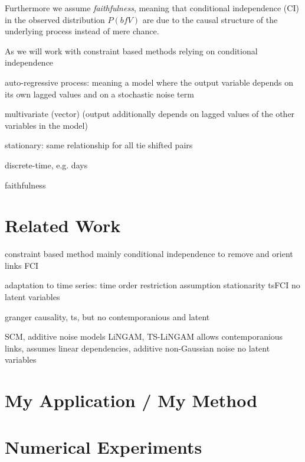 \documentclass[conference]{IEEEtran}
\begin{document}
Furthermore we assume \textit{faithfulness}, meaning that conditional independence (CI) in the observed distribution $P(bf{V})$ are due to the causal structure of the underlying process instead of mere chance.


As we will work with constraint based methods relying on conditional independence 


auto-regressive process:
meaning a model where the output variable depends on its own lagged values and on a stochastic noise term


multivariate (vector) (output additionally depends on lagged values of the other variables in the model)

stationary: same relationship for all tie shifted pairs

discrete-time, e.g. days






faithfulness


\section{Related Work}
constraint based method
mainly conditional independence
to remove and orient links
FCI

adaptation to time series: 
time order restriction
assumption stationarity
tsFCI
no latent variables

granger causality, ts, but no contemporanious and latent

SCM, additive noise models
LiNGAM,
TS-LiNGAM
allows contemporanious links, assumes linear dependencies, additive non-Gaussian noise
no latent variables







\section{My Application / My Method}




\section{Numerical Experiments}


\end{document}

